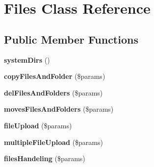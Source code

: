 \hypertarget{class_zest_1_1_files_1_1_files}{}\section{Files Class Reference}
\label{class_zest_1_1_files_1_1_files}
\subsection*{Public Member Functions}
\begin{DoxyCompactItemize}
\item 
\mbox{\label{class_zest_1_1_files_1_1_files_a233511290d28a4a7e933f15a6176afb2}} 
{\bfseries system\+Dirs} ()
\item 
\mbox{\label{class_zest_1_1_files_1_1_files_a3c4d75411bbee5393eaaff6525fbf5f2}} 
{\bfseries copy\+Files\+And\+Folder} (\$params)
\item 
\mbox{\label{class_zest_1_1_files_1_1_files_a11b85e80667727615719bc76459571d7}} 
{\bfseries del\+Files\+And\+Folders} (\$params)
\item 
\mbox{\label{class_zest_1_1_files_1_1_files_a96751d6d5a1c5c860d6197270a1cab44}} 
{\bfseries moves\+Files\+And\+Folders} (\$params)
\item 
\mbox{\label{class_zest_1_1_files_1_1_files_a6bfb8809c365e5ecee72ddc45f5b0736}} 
{\bfseries file\+Upload} (\$params)
\item 
\mbox{\label{class_zest_1_1_files_1_1_files_a7e149e2aaf3a5acc25782fc3c4cfa58c}} 
{\bfseries multiple\+File\+Upload} (\$params)
\item 
\mbox{\label{class_zest_1_1_files_1_1_files_a4d34a3ac51363a5678874d01a084d82b}} 
{\bfseries files\+Handeling} (\$params)
\end{DoxyCompactItemize}
